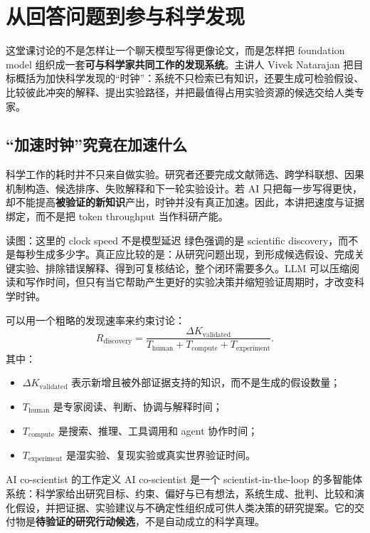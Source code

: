\section{从回答问题到参与科学发现}

这堂课讨论的不是怎样让一个聊天模型写得更像论文，而是怎样把 foundation model 组织成一套\textbf{可与科学家共同工作的发现系统}。主讲人 Vivek Natarajan 把目标概括为加快科学发现的“时钟”：系统不只检索已有知识，还要生成可检验假设、比较彼此冲突的解释、提出实验路径，并把最值得占用实验资源的候选交给人类专家。

\subsection{“加速时钟”究竟在加速什么}

科学工作的耗时并不只来自做实验。研究者还要完成文献筛选、跨学科联想、因果机制构造、候选排序、失败解释和下一轮实验设计。若 AI 只把每一步写得更快，却不能提高\textbf{被验证的新知识}产出，时钟并没有真正加速。因此，本讲把速度与证据绑定，而不是把 token throughput 当作科研产能。


\begin{knowledgebox}{读图：这里的 clock speed 不是模型延迟}
绿色强调的是 scientific discovery，而不是每秒生成多少字。真正应比较的是：从研究问题出现，到形成候选假设、完成关键实验、排除错误解释、得到可复核结论，整个闭环需要多久。LLM 可以压缩阅读和写作时间，但只有当它帮助产生更好的实验决策并缩短验证周期时，才改变科学时钟。
\end{knowledgebox}

可以用一个粗略的发现速率来约束讨论：
$$
R_{\text{discovery}}
=\frac{\Delta K_{\text{validated}}}
{T_{\text{human}}+T_{\text{compute}}+T_{\text{experiment}}}.
$$
其中：
\begin{itemize}
  \item $\Delta K_{\text{validated}}$ 表示新增且被外部证据支持的知识，而不是生成的假设数量；
  \item $T_{\text{human}}$ 是专家阅读、判断、协调与解释时间；
  \item $T_{\text{compute}}$ 是搜索、推理、工具调用和 agent 协作时间；
  \item $T_{\text{experiment}}$ 是湿实验、复现实验或真实世界验证时间。
\end{itemize}

\begin{importantbox}{AI co-scientist 的工作定义}
AI co-scientist 是一个 scientist-in-the-loop 的多智能体系统：科学家给出研究目标、约束、偏好与已有想法，系统生成、批判、比较和演化假设，并把证据、实验建议与不确定性组织成可供人类决策的研究提案。它的交付物是\textbf{待验证的研究行动候选}，不是自动成立的科学真理。
\end{importantbox}

